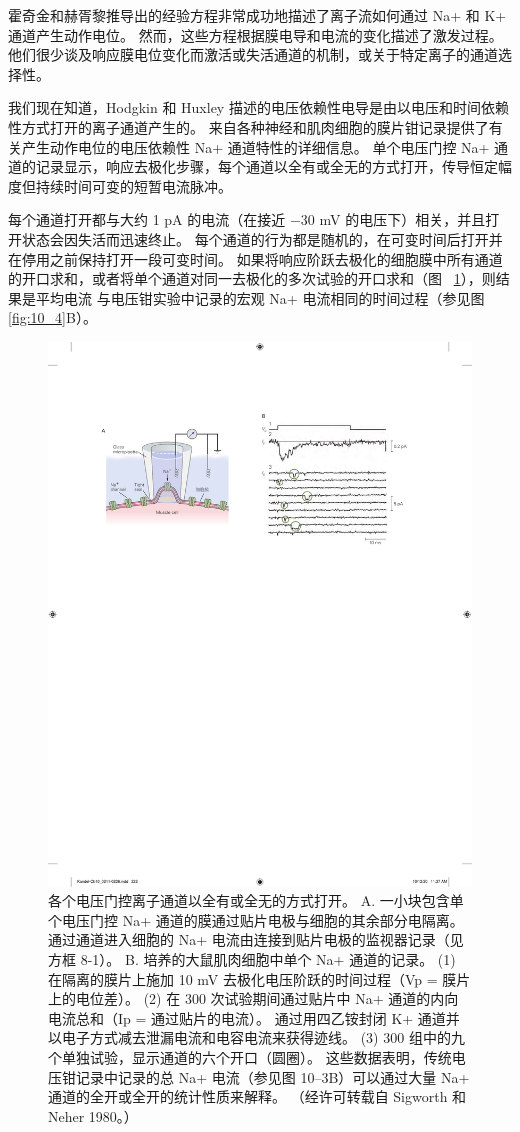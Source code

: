 霍奇金和赫胥黎推导出的经验方程非常成功地描述了离子流如何通过 Na+ 和 K+ 通道产生动作电位。
然而，这些方程根据膜电导和电流的变化描述了激发过程。
他们很少谈及响应膜电位变化而激活或失活通道的机制，或关于特定离子的通道选择性。


我们现在知道，Hodgkin 和 Huxley 描述的电压依赖性电导是由以电压和时间依赖性方式打开的离子通道产生的。
来自各种神经和肌肉细胞的膜片钳记录提供了有关产生动作电位的电压依赖性 Na+ 通道特性的详细信息。
单个电压门控 Na+ 通道的记录显示，响应去极化步骤，每个通道以全有或全无的方式打开，传导恒定幅度但持续时间可变的短暂电流脉冲。


每个通道打开都与大约 1 pA 的电流（在接近 −30 mV 的电压下）相关，并且打开状态会因失活而迅速终止。 
每个通道的行为都是随机的，在可变时间后打开并在停用之前保持打开一段可变时间。
如果将响应阶跃去极化的细胞膜中所有通道的开口求和，或者将单个通道对同一去极化的多次试验的开口求和（图 ~\ref{fig:10_9}），则结果是平均电流 与电压钳实验中记录的宏观 Na+ 电流相同的时间过程（参见图 \ref{fig:10_4}B）。


\begin{figure}[htbp]
	\centering
	\includegraphics[width=0.5\linewidth]{chap10/fig_10_9}
	\caption{各个电压门控离子通道以全有或全无的方式打开。 A. 一小块包含单个电压门控 Na+ 通道的膜通过贴片电极与细胞的其余部分电隔离。 通过通道进入细胞的 Na+ 电流由连接到贴片电极的监视器记录（见方框 8-1）。 B. 培养的大鼠肌肉细胞中单个 Na+ 通道的记录。 (1) 在隔离的膜片上施加 10 mV 去极化电压阶跃的时间过程（Vp = 膜片上的电位差）。 (2) 在 300 次试验期间通过贴片中 Na+ 通道的内向电流总和（Ip = 通过贴片的电流）。 通过用四乙铵封闭 K+ 通道并以电子方式减去泄漏电流和电容电流来获得迹线。 (3) 300 组中的九个单独试验，显示通道的六个开口（圆圈）。 这些数据表明，传统电压钳记录中记录的总 Na+ 电流（参见图 10–3B）可以通过大量 Na+ 通道的全开或全开的统计性质来解释。 （经许可转载自 Sigworth 和 Neher 1980。）}
	\label{fig:10_9}
\end{figure}


